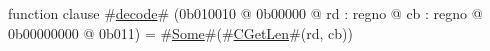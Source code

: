 function clause #\hyperref[zdecode]{decode}# (0b010010 @ 0b00000 @ rd : regno @ cb : regno @ 0b00000000 @ 0b011) = #\hyperref[zSome]{Some}#(#\hyperref[zCGetLen]{CGetLen}#(rd, cb))
